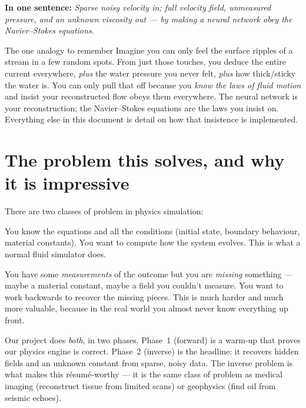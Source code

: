 \documentclass[11pt,a4paper]{article}
\begin{document}
\vspace{0.5em}
\noindent\textbf{In one sentence:} \emph{Sparse noisy velocity in;
full velocity field, unmeasured pressure, and an unknown viscosity out ---
by making a neural network obey the Navier--Stokes equations.}

\begin{intuitionbox}{The one analogy to remember}
Imagine you can only feel the surface ripples of a stream in a few random
spots. From just those touches, you deduce the entire current everywhere,
\emph{plus} the water pressure you never felt, \emph{plus} how thick/sticky the
water is. You can only pull that off because you \emph{know the laws of fluid
motion} and insist your reconstructed flow obeys them everywhere. The neural
network is your reconstruction; the Navier--Stokes equations are the laws you
insist on. Everything else in this document is detail on how that insistence is
implemented.
\end{intuitionbox}

\section{The problem this solves, and why it is impressive}
\label{sec:why-impressive}

There are two classes of problem in physics simulation:

\begin{description}[leftmargin=2em, style=nextline]
  \item[The forward problem] You know the equations and all the conditions
    (initial state, boundary behaviour, material constants). You want to
    compute how the system evolves. This is what a normal fluid simulator
    does.
  \item[The inverse problem] You have some \emph{measurements} of the outcome
    but you are \emph{missing} something --- maybe a material constant, maybe a
    field you couldn't measure. You want to work backwards to recover the
    missing pieces. This is much harder and much more valuable, because in the
    real world you almost never know everything up front.
\end{description}

Our project does \emph{both}, in two phases. Phase~1 (forward) is a warm-up
that proves our physics engine is correct. Phase~2 (inverse) is the headline:
it recovers hidden fields and an unknown constant from sparse, noisy data. The
inverse problem is what makes this r\'esum\'e-worthy --- it is the same class of
problem as medical imaging (reconstruct tissue from limited scans) or
geophysics (find oil from seismic echoes).
\end{document}
